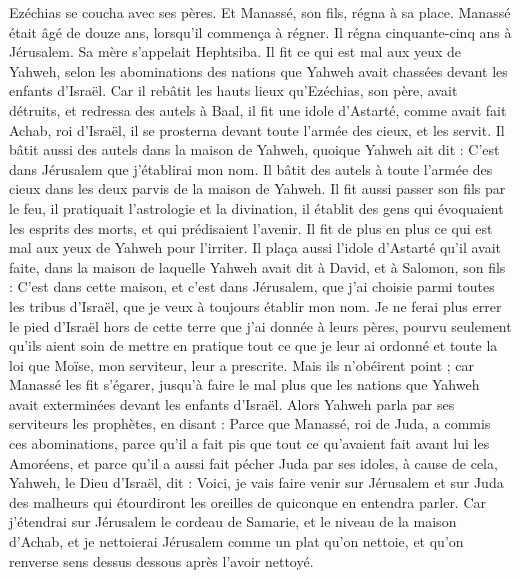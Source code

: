 \begin{multicols}{2}
Ezéchias se coucha avec ses pères. Et Manassé, son fils, régna à sa place.
\VerseOne{}Manassé était âgé de douze ans, lorsqu’il commença à régner. Il régna cinquante-cinq ans à Jérusalem. Sa mère s’appelait Hephtsiba.
Il fit ce qui est mal aux yeux de Yahweh, selon les abominations des nations que Yahweh avait chassées devant les enfants d’Israël.
Car il rebâtit les hauts lieux qu’Ezéchias, son père, avait détruits, et redressa des autels à Baal, il fit une idole d’Astarté, comme avait fait Achab, roi d’Israël, il se prosterna devant toute l’armée des cieux, et les servit.
Il bâtit aussi des autels dans la maison de Yahweh, quoique Yahweh ait dit : C’est dans Jérusalem que j’établirai mon nom.
Il bâtit des autels à toute l’armée des cieux dans les deux parvis de la maison de Yahweh.
Il fit aussi passer son fils par le feu, il pratiquait l’astrologie et la divination, il établit des gens qui évoquaient les esprits des morts, et qui prédisaient l’avenir. Il fit de plus en plus ce qui est mal aux yeux de Yahweh pour l’irriter.
Il plaça aussi l’idole d’Astarté qu’il avait faite, dans la maison de laquelle Yahweh avait dit à David, et à Salomon, son fils : C’est dans cette maison, et c’est dans Jérusalem, que j’ai choisie parmi toutes les tribus d’Israël, que je veux à toujours établir mon nom.
Je ne ferai plus errer le pied d’Israël hors de cette terre que j’ai donnée à leurs pères, pourvu seulement qu’ils aient soin de mettre en pratique tout ce que je leur ai ordonné et toute la loi que Moïse, mon serviteur, leur a prescrite.
Mais ils n’obéirent point ; car Manassé les fit s’égarer, jusqu’à faire le mal plus que les nations que Yahweh avait exterminées devant les enfants d’Israël.
Alors Yahweh parla par ses serviteurs les prophètes, en disant :
Parce que Manassé, roi de Juda, a commis ces abominations, parce qu’il a fait pis que tout ce qu’avaient fait avant lui les Amoréens, et parce qu’il a aussi fait pécher Juda par ses idoles,
à cause de cela, Yahweh, le Dieu d’Israël, dit : Voici, je vais faire venir sur Jérusalem et sur Juda des malheurs qui étourdiront les oreilles de quiconque en entendra parler.
Car j’étendrai sur Jérusalem le cordeau de Samarie, et le niveau de la maison d’Achab, et je nettoierai Jérusalem comme un plat qu’on nettoie, et qu’on renverse sens dessus dessous après l’avoir nettoyé.

\end{multicols}
